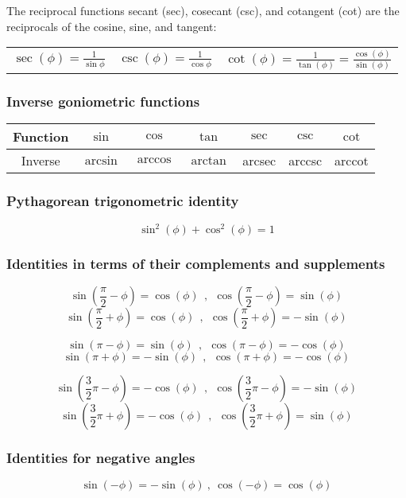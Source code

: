 The reciprocal functions secant (sec), cosecant (csc), and cotangent (cot) are the reciprocals of the cosine, sine, and tangent:

\begin{table}[ht!]
	\centering
	\begin{tabular}{ c | c | c }
	$ \displaystyle \sec(\phi)=\frac{1}{\sin{\phi}} $  &
	$ \displaystyle \csc(\phi)=\frac{1}{\cos{\phi}} $  &
	$ \displaystyle \cot(\phi)=\frac{1}{\tan(\phi)}=\frac{\cos(\phi)}{\sin(\phi)} $
	\end{tabular}
\end{table}

\subsubsection{Inverse goniometric functions}
\begin{tabular}{  | c || c | c | c | c | c | c | }
	\hline
	Function   &  $\sin$  &  $\cos$  &  $\tan$  &  $\sec$ &  $\csc$ &  $\cot$ \\
	\hline
	Inverse   &  $\arcsin$  &  $\arccos$  &  $\arctan$  &  arcsec  &  arccsc  &  arccot \\
	\hline	
\end{tabular}


\subsubsection{Pythagorean trigonometric identity}
\[
\sin^2(\phi)+\cos^2(\phi)=1 
\]


\subsubsection{Identities in terms of their complements and supplements}
\[
\sin\left(\frac{\pi}{2}-\phi\right)=\cos(\phi) \ \ , \ \ \cos\left(\frac{\pi}{2}-\phi\right)=\sin(\phi)
\]
\[
\sin\left(\frac{\pi}{2}+\phi\right)=\cos(\phi) \ \ , \ \ \cos\left(\frac{\pi}{2}+\phi\right)=-\sin(\phi)
\]

\[
\sin(\pi-\phi)=\sin(\phi) \ \ , \ \ \cos(\pi-\phi)=-\cos(\phi)
\]
\[
\sin(\pi+\phi)=-\sin(\phi) \ \ , \ \ \cos(\pi+\phi)=-\cos(\phi)
\]

\[
\sin\left(\frac{3}{2}\pi-\phi\right)=-\cos(\phi) \ \ , \ \ \cos\left(\frac{3}{2}\pi-\phi\right)=-\sin(\phi)
\]
\[
\sin\left(\frac{3}{2}\pi+\phi\right)=-\cos(\phi) \ \ , \ \ \cos\left(\frac{3}{2}\pi+\phi\right)=\sin(\phi)
\]


\subsubsection{Identities for negative angles}
\[
\sin(-\phi) = -\sin(\phi) \ , \ \cos(-\phi) = \cos(\phi)
\]


